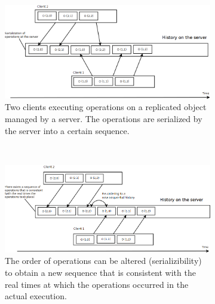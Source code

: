 \begin{figure}[h]
        \centering
        \begin{subfigure}[t]{0.3\textwidth}
                                        \centering
                                        \includegraphics[width=\textwidth]{img/systems-and-architectures/linearizability_1}
                                        \caption{Two clients executing operations on a replicated object managed by a server. The operations are serialized by the server into a certain sequence.}
                                        \label{figure:linearizability:a}
        \end{subfigure}%
        ~
        \begin{subfigure}[t]{0.3\textwidth}
                                        \centering
                                        \includegraphics[width=\textwidth]{img/systems-and-architectures/linearizability_2}
                                        \caption{The order of operations can be altered (serializibility) to obtain a new sequence that is consistent with the real times at which the operations occurred in the actual execution.}
                                        \label{figure:linearizability:b}
        \end{subfigure}
        ~
        \begin{subfigure}[t]{0.3\textwidth}
                                        \centering

\end{subfigure}
\end{figure}
